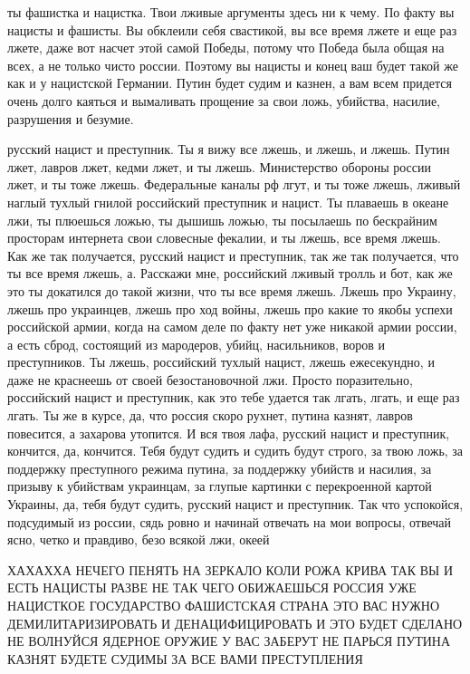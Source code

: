 ты фашистка и нацистка. Твои лживые аргументы здесь ни к чему. По факту вы
нацисты и фашисты. Вы обклеили себя свастикой, вы все время лжете и еще раз
лжете, даже вот насчет этой самой Победы, потому что Победа была общая на всех,
а не только чисто россии. Поэтому вы нацисты и конец ваш будет такой же как и у
нацистской Германии. Путин будет судим и казнен, а вам всем придется очень
долго каяться и вымаливать прощение за свои ложь, убийства, насилие, разрушения
и безумие.

русский нацист и преступник. Ты я вижу все лжешь, и лжешь, и лжешь. Путин лжет,
лавров лжет, кедми лжет, и ты лжешь. Министерство обороны россии лжет, и ты
тоже лжешь.  Федеральные каналы рф лгут, и ты тоже лжешь, лживый наглый тухлый
гнилой российский преступник и нацист. Ты плаваешь в океане лжи, ты плюешься
ложью, ты дышишь ложью, ты посылаешь по бескрайним просторам интернета свои
словесные фекалии, и ты лжешь, все время лжешь.  Как же так получается, русский
нацист и преступник, так же так получается, что ты все время лжешь, а.
Расскажи мне, российский лживый тролль и бот, как же это ты докатился до такой
жизни, что ты все время лжешь. Лжешь про Украину, лжешь про украинцев, лжешь
про ход войны, лжешь про какие то якобы успехи российской армии, когда на самом
деле по факту нет уже никакой армии россии, а есть сброд, состоящий из
мародеров, убийц, насильников, воров и преступников. Ты лжешь, российский
тухлый нацист, лжешь ежесекундно, и даже не краснеешь от своей безостановочной
лжи. Просто поразительно, российский нацист и преступник, как это тебе удается
так лгать, лгать, и еще раз лгать. Ты же в курсе, да, что россия скоро рухнет,
путина казнят, лавров повесится, а захарова утопится. И вся твоя лафа, русский
нацист и преступник, кончится, да, кончится. Тебя будут судить и судить будут
строго, за твою ложь, за поддержку преступного режима путина, за поддержку
убийств и насилия, за призыву к убийствам украинцам, за глупые картинки с
перекроенной картой Украины, да, тебя будут судить, русский нацист и
преступник. Так что успокойся, подсудимый из россии, сядь ровно и начинай
отвечать на мои вопросы, отвечай ясно, четко и правдиво, безо всякой лжи,
океей

ХАХАХХА НЕЧЕГО ПЕНЯТЬ НА ЗЕРКАЛО КОЛИ РОЖА КРИВА ТАК ВЫ И ЕСТЬ НАЦИСТЫ РАЗВЕ НЕ
ТАК ЧЕГО ОБИЖАЕШЬСЯ РОССИЯ УЖЕ НАЦИСТКОЕ ГОСУДАРСТВО ФАШИСТСКАЯ СТРАНА ЭТО ВАС
НУЖНО ДЕМИЛИТАРИЗИРОВАТЬ И ДЕНАЦИФИЦИРОВАТЬ И ЭТО БУДЕТ СДЕЛАНО НЕ ВОЛНУЙСЯ
ЯДЕРНОЕ ОРУЖИЕ У ВАС ЗАБЕРУТ НЕ ПАРЬСЯ ПУТИНА КАЗНЯТ БУДЕТЕ СУДИМЫ ЗА ВСЕ ВАМИ
ПРЕСТУПЛЕНИЯ

